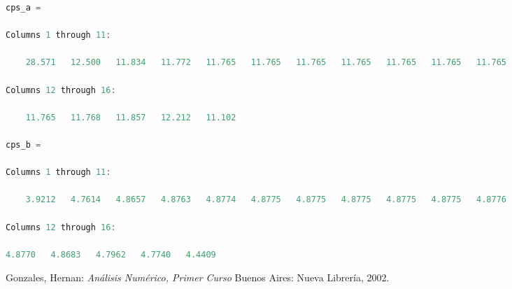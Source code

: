 \documentclass[11pt,a4paper]{article}
\begin{document}
\begin{lstlisting}[language=Octave,title=Cps calculados para las distintas iteraciones]
cps_a =

Columns 1 through 11:

    28.571   12.500   11.834   11.772   11.765   11.765   11.765   11.765   11.765   11.765   11.765

Columns 12 through 16:

    11.765   11.768   11.857   12.212   11.102

cps_b =

Columns 1 through 11:

    3.9212   4.7614   4.8657   4.8763   4.8774   4.8775   4.8775   4.8775   4.8775   4.8775   4.8776

Columns 12 through 16:

4.8770   4.8683   4.7962   4.7740   4.4409
\end{lstlisting}


\newpage

{}
\renewcommand\refname{Bibliografía}
\begin{thebibliography}{9}

Gonzales, Hernan: 
\textit{Análisis Numérico, Primer Curso}
Buenos Aires: Nueva Librería, 2002.

\end{thebibliography}
\end{document}
